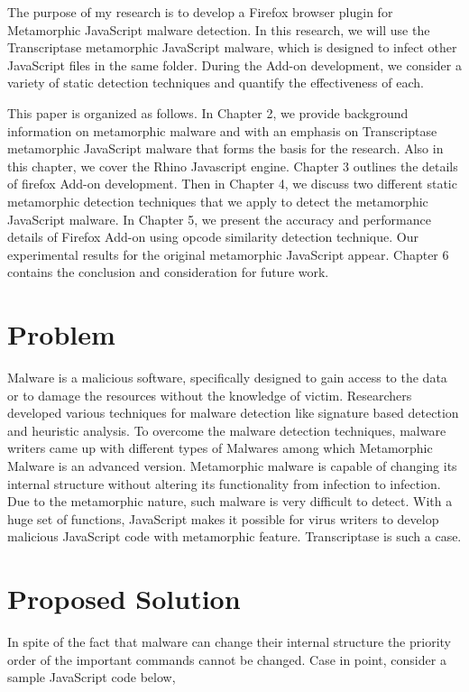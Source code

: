 The purpose of my research is to develop a Firefox browser plugin for Metamorphic JavaScript malware detection. In this research, we will use the Transcriptase metamorphic JavaScript malware, which is designed to infect other JavaScript files in the same folder. During the Add-on development, we consider a variety of static detection techniques and quantify the effectiveness of each. 

This paper is organized as follows. In Chapter 2, we provide background information on metamorphic malware and with an emphasis on Transcriptase metamorphic JavaScript malware that forms the basis for the research. Also in this chapter, we cover the Rhino Javascript engine. Chapter 3 outlines the details of firefox Add-on development. Then in Chapter 4, we discuss two different static metamorphic detection techniques that we apply to detect the metamorphic JavaScript malware. In Chapter 5, we present the accuracy and performance details of Firefox Add-on using opcode similarity detection technique. Our experimental results for the original metamorphic JavaScript appear. Chapter 6 contains the conclusion and consideration for future work.

\section{Problem} 

Malware is a malicious software, specifically designed to gain access to the data or to damage the resources without the knowledge of victim. Researchers developed various techniques for malware detection like signature based detection and heuristic analysis. To overcome the malware detection techniques, malware writers came up with different types of Malwares among which Metamorphic Malware is an advanced version. Metamorphic malware is capable of changing its internal structure without altering its functionality from infection to infection. Due to the metamorphic nature, such malware is very difficult to detect. With a huge set of functions, JavaScript makes it possible for virus writers to develop malicious JavaScript code with metamorphic feature. Transcriptase is such a case.

\section{Proposed Solution}

In spite of the fact that malware can change their internal structure the priority order of the important commands cannot be changed. Case in point, consider a sample JavaScript code below,

